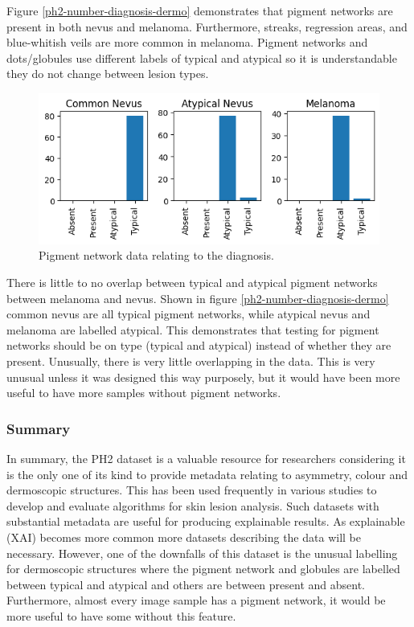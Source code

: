 Figure \ref{ph2-number-diagnosis-dermo} demonstrates that pigment networks are present in both nevus and melanoma. Furthermore, streaks, regression areas, and blue-whitish veils are more common in melanoma. Pigment networks and dots/globules use different labels of typical and atypical so it is understandable they do not change between lesion types.

\begin{figure}
	\centering
	\includegraphics[scale=0.8]{images/ph2/ph2-pigment-diagnosis.png}
	\caption{Pigment network data relating to the diagnosis.} 
\end{figure} \label{ph2-number-diagnosis-dermo}


There is little to no overlap between typical and atypical pigment networks between melanoma and nevus. Shown in figure \ref{ph2-number-diagnosis-dermo} common nevus are all typical pigment networks, while atypical nevus and melanoma are labelled atypical. This demonstrates that testing for pigment networks should be on type (typical and atypical) instead of whether they are present. Unusually, there is very little overlapping in the data. This is very unusual unless it was designed this way purposely, but it would have been more useful to have more samples without pigment networks.

\subsubsection{Summary}
In summary, the PH2 dataset is a valuable resource for researchers considering it is the only one of its kind to provide metadata relating to asymmetry, colour and dermoscopic structures. This has been used frequently in various studies to develop and evaluate algorithms for skin lesion analysis. Such datasets with substantial metadata are useful for producing explainable results. As explainable (XAI) becomes more common more datasets describing the data will be necessary. However, one of the downfalls of this dataset is the unusual labelling for dermoscopic structures where the pigment network and globules are labelled between typical and atypical and others are between present and absent. Furthermore, almost every image sample has a pigment network, it would be more useful to have some without this feature.


